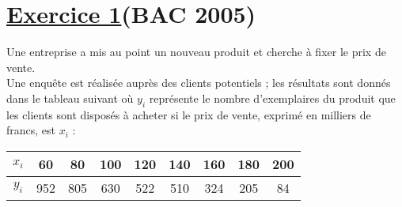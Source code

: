 \documentclass[12pt,a4paper]{article}
\begin{document}
\renewcommand{\arraystretch}{1.5}
\renewcommand{\arrayrulewidth}{1.2pt}
\vspace{3cm}
\noindent
\section*{\underline{Exercice 1}(BAC 2005)}
Une entreprise a mis au point un nouveau produit et cherche à fixer le prix de vente.\\
Une enquête est réalisée auprès des clients potentiels ; les résultats sont donnés dans le tableau suivant où \( y_i \) représente le nombre d’exemplaires du produit que les clients sont disposés à acheter si le prix de vente, exprimé en milliers de francs, est \( x_i \) :

\vspace{0.3cm}
\begin{center}
\begin{tabular}{|c|cccccccc|}
\hline
\( x_i \) & 60 & 80 & 100 & 120 & 140 & 160 & 180 & 200 \\
\hline
\( y_i \) & 952 & 805 & 630 & 522 & 510 & 324 & 205 & 84 \\
\hline
\end{tabular}
\end{center}
\end{document}
